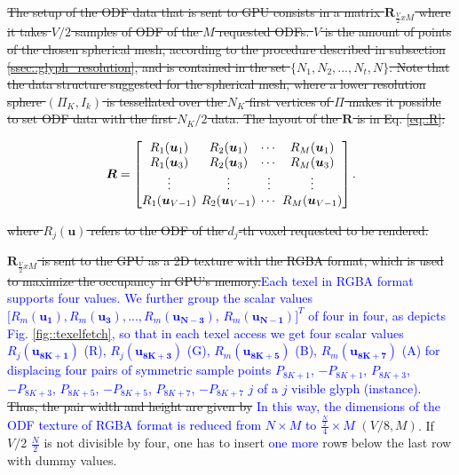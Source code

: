 \documentclass[twoside,twocolumn,10pt]{article}
\begin{document}
\sout{The setup of the ODF data that is sent to GPU consists in a matrix $\bm{R}_{\frac{V}{2}xM}$ where it takes $V/2$ samples of ODF of the $M$ requested ODFs. $V$ is the amount of points of the chosen spherical mesh, according to the procedure described in subsection \ref{ssec::glyph_resolution}, and is contained in the set $\{N_1, N_2, ..., N_t, N\}$. Note that the data structure suggested for the spherical mesh, where a lower resolution sphere $(\Pi_K, I_k)$ is tessellated over the $N_K$ first vertices of $\Pi$ makes it possible to set ODF data with the first $N_K/2$ data. The layout of the $\bm{R}$ is in Eq. \ref{eq::R}:} 

\begin{equation}
\label{eq::R}
\bm{R} = 
\begingroup %
\setlength\arraycolsep{2pt}
\begin{bmatrix} 
    R_1(\bm{u}_1) &     R_2(\bm{u}_1)      & \cdots  &     R_M(\bm{u}_{1})  \\    
     R_1(\bm{u}_3)&     R_2(\bm{u}_3)      & \cdots  &     R_M(\bm{u}_{3}) \\
    \vdots & \vdots & \vdots & \vdots  \\    
     R_1(\bm{u}_{V-1}) & R_2(\bm{u}_{V-1}) & \cdots  & R_M(\bm{u}_{V-1})
\end{bmatrix}.
\endgroup
\end{equation}

\sout{where $R_j(\bm{u})$ refers to the ODF of the $d_j$-th voxel requested to be rendered.}

\sout{$\bm{R}_{\frac{V}{2}xM}$ is sent to the GPU as a 2D texture with the RGBA format, which is used to maximize the occupancy in GPU's memory.}\textcolor{blue}{Each texel in RGBA format supports four values. We further group the scalar values $[R_m(\bm{u_1}), R_m(\bm{u_3}), ..., R_m(\bm{u_{N-3}})$, $R_m(\bm{u_{N-1}})]^T$ of four in four, as depicts Fig. \ref{fig::texelfetch}, so that in each texel access we get four scalar values $R_j(\bm{u_{8K+1}})$ (R), $R_j(\bm{u_{8K+3}})$ (G), $R_m(\bm{u_{8K+5}})$ (B), $R_m(\bm{u_{8K+7}})$ (A) for displacing four pairs of symmetric sample points $P_{8K+1}$, $-P_{8K+1}$, $P_{8K+3}$, $-P_{8K+3}$, $P_{8K+5}$, $-P_{8K+5}$, $P_{8K+7}$, $-P_{8K+7}$ $j$ of a $j$ visible glyph (instance).} \sout{Thus, the pair width and height are given by} \textcolor{blue}{In this way, the dimensions of the ODF texture of RGBA format is reduced from $N \times M$ to $ \frac{\frac{N}{2}}{4} \times M$}\sout{ $(V/8, M)$}. If \sout{$V/2$} \textcolor{blue}{$\frac{N}{2}$} is not divisible by four, one has to insert \textcolor{blue}{one more} row\sout{s} below the last row with dummy values.
\end{document}
